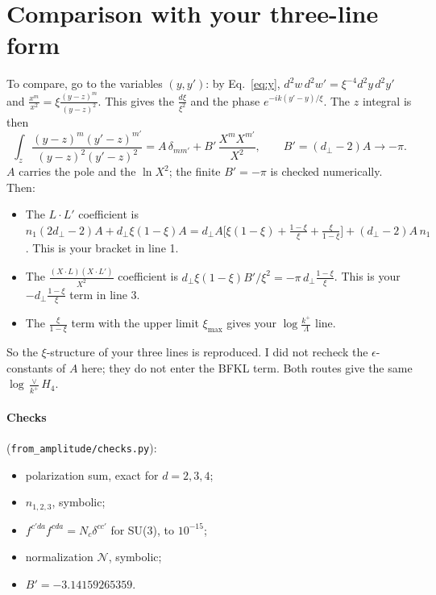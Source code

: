 \documentclass[10pt]{article}
\numberwithin{equation}{section}
\begin{document}
\section{Comparison with your three-line form}
To compare, go to the variables $(y,y')$: by Eq.~\eqref{eq:y}, $d^2w\,d^2w'=\xi^{-4}d^2y\,d^2y'$ and $\frac{x^m}{x^2}=\xi\frac{(y-z)^m}{(y-z)^2}$. This gives the $\frac{d\xi}{\xi^2}$ and the phase $e^{-ik(y'-y)/\xi}$. The $z$ integral is then
\begin{equation}
\int_z\frac{(y-z)^m(y'-z)^{m'}}{(y-z)^2(y'-z)^2}=A\,\delta_{mm'}+B'\,\frac{X^mX^{m'}}{X^2},\qquad B'=(d_\perp-2)A\to-\pi .
\end{equation}
$A$ carries the pole and the $\ln X^2$; the finite $B'=-\pi$ is checked numerically. Then:
\begin{itemize}
\item The $L\cdot L'$ coefficient is $n_1(2d_\perp-2)A+d_\perp\xi(1-\xi)A=d_\perp A\big[\xi(1-\xi)+\frac{1-\xi}{\xi}+\frac{\xi}{1-\xi}\big]+(d_\perp-2)A\,n_1$. This is your bracket in line 1.
\item The $\frac{(X\cdot L)(X\cdot L')}{X^2}$ coefficient is $d_\perp\xi(1-\xi)B'/\xi^2=-\pi\,d_\perp\frac{1-\xi}{\xi}$. This is your $-d_\perp\frac{1-\xi}{\xi}$ term in line 3.
\item The $\frac{\xi}{1-\xi}$ term with the upper limit $\xi_{\max}$ gives your $\log\frac{k^+}{\Lambda}$ line.
\end{itemize}
So the $\xi$-structure of your three lines is reproduced. I did not recheck the $\epsilon$-constants of $A$ here; they do not enter the BFKL term. Both routes give the same $\log\frac{\vee}{k^+}H_4$.

\paragraph{Checks} (\texttt{from\_amplitude/checks.py}):
\begin{itemize}
\item polarization sum, exact for $d=2,3,4$;
\item $n_{1,2,3}$, symbolic;
\item $f^{c'da}f^{cda}=N_c\delta^{cc'}$ for SU(3), to $10^{-15}$;
\item normalization $\mathcal N$, symbolic;
\item $B'=-3.14159265359$.
\end{itemize}
\end{document}

